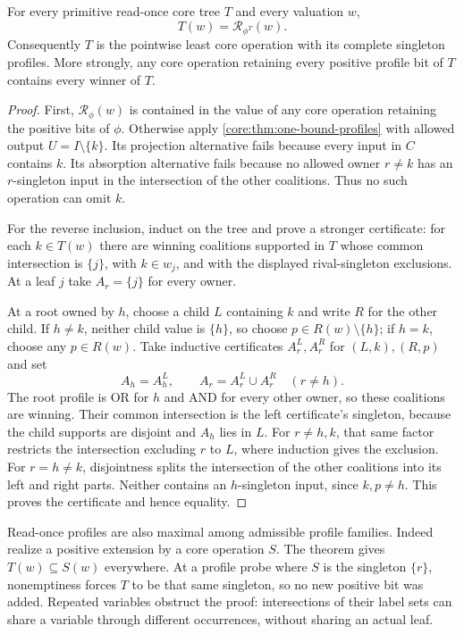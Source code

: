 \begin{theorem}\label{core:thm:read-once-minimum}
For every primitive read-once core tree $T$ and every valuation $w$,
\[
 T(w)=\mathcal R_{\phi^T}(w).
\]
Consequently $T$ is the pointwise least core operation with its complete
singleton profiles. More strongly, any core operation retaining every
positive profile bit of $T$ contains every winner of $T$.
\end{theorem}
\begin{proof}
First, $\mathcal R_\phi(w)$ is contained in the value of any core operation
retaining the positive bits of $\phi$. Otherwise apply
\cref{core:thm:one-bound-profiles} with allowed output
$U=I\setminus\{k\}$. Its projection alternative fails because every
input in $C$ contains $k$. Its absorption alternative fails because no
allowed owner $r\ne k$ has an $r$-singleton input in the intersection of
the other coalitions. Thus no such operation can omit $k$.

For the reverse inclusion, induct on the tree and prove a stronger
certificate: for each $k\in T(w)$ there are winning coalitions supported
in $T$ whose common intersection is $\{j\}$, with $k\in w_j$, and with
the displayed rival-singleton exclusions. At a leaf $j$ take
$A_r=\{j\}$ for every owner.

At a root owned by $h$, choose a child $L$ containing $k$ and write $R$
for the other child. If $h\ne k$, neither child value is $\{h\}$, so
choose $p\in R(w)\setminus\{h\}$; if $h=k$, choose any $p\in R(w)$.
Take inductive certificates $A_r^L,A_r^R$ for $(L,k),(R,p)$ and set
\[
 A_h=A_h^L,\qquad A_r=A_r^L\cup A_r^R\quad(r\ne h).
\]
The root profile is OR for $h$ and AND for every other owner, so these
coalitions are winning. Their common intersection is the left certificate's
singleton, because the child supports are disjoint and $A_h$ lies in $L$.
For $r\ne h,k$, that same factor restricts the intersection excluding $r$
to $L$, where induction gives the exclusion. For $r=h\ne k$, disjointness
splits the intersection of the other coalitions into its left and right
parts. Neither contains an $h$-singleton input, since $k,p\ne h$.
This proves the certificate and hence equality.
\end{proof}

Read-once profiles are also maximal among admissible profile families.
Indeed realize a positive extension by a core operation $S$. The theorem
gives $T(w)\subseteq S(w)$ everywhere. At a profile probe where $S$ is
the singleton $\{r\}$, nonemptiness forces $T$ to be that same singleton,
so no new positive bit was added. Repeated variables obstruct the proof:
intersections of their label sets can share a variable through different
occurrences, without sharing an actual leaf.

